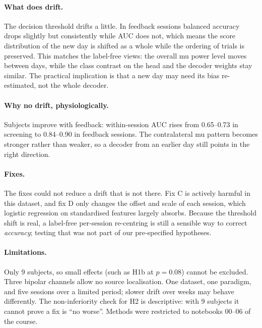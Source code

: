 \documentclass[11pt,a4paper]{article}
\begin{document}
\paragraph{What does drift.} The decision threshold drifts a little. In feedback sessions balanced accuracy drops slightly but
consistently while AUC does not, which means the score distribution of the new day is shifted as a whole while the ordering of
trials is preserved. This matches the label-free views: the overall mu power level moves between days, while the class contrast
on the head and the decoder weights stay similar. The practical implication is that a new day may need its bias re-estimated,
not the whole decoder.

\paragraph{Why no drift, physiologically.} Subjects improve with feedback: within-session AUC rises from 0.65--0.73 in screening
to 0.84--0.90 in feedback sessions. The contralateral mu pattern becomes stronger rather than weaker, so a decoder from an earlier
day still points in the right direction.

\paragraph{Fixes.} The fixes could not reduce a drift that is not there. Fix C is actively harmful in this dataset, and fix D only
changes the offset and scale of each session, which logistic regression on standardised features largely absorbs. Because the
threshold shift is real, a label-free per-session re-centring is still a sensible way to correct \emph{accuracy}; testing that was
not part of our pre-specified hypotheses.

\paragraph{Limitations.} Only 9 subjects, so small effects (such as H1b at $p=0.08$) cannot be excluded. Three bipolar channels
allow no source localisation. One dataset, one paradigm, and five sessions over a limited period; slower drift over weeks may
behave differently. The non-inferiority check for H2 is descriptive: with 9 subjects it cannot prove a fix is ``no worse''.
Methods were restricted to notebooks 00--06 of the course.
\end{document}
